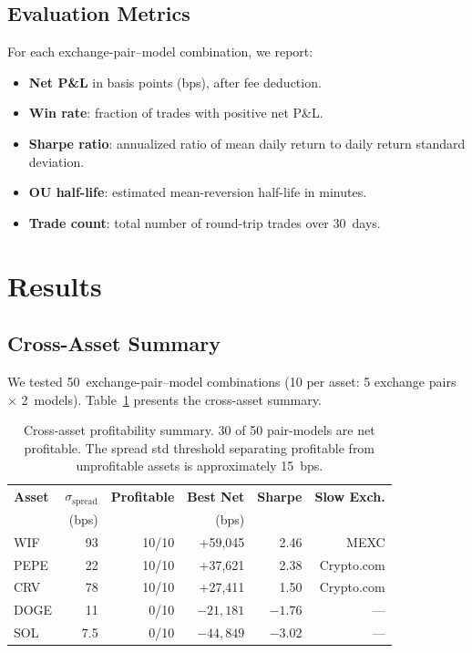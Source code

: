 \documentclass[sigconf,nonacm=false]{acmart}
\begin{document}
\subsection{Evaluation Metrics}

For each exchange-pair--model combination, we report:
\begin{itemize}
    \item \textbf{Net P\&L} in basis points (bps), after fee deduction.
    \item \textbf{Win rate}: fraction of trades with positive net P\&L.
    \item \textbf{Sharpe ratio}: annualized ratio of mean daily return to daily return standard deviation.
    \item \textbf{OU half-life}: estimated mean-reversion half-life in minutes.
    \item \textbf{Trade count}: total number of round-trip trades over 30~days.
\end{itemize}

\section{Results}\label{sec:results}

\subsection{Cross-Asset Summary}

We tested 50~exchange-pair--model combinations (10 per asset: 5 exchange pairs $\times$ 2~models). Table~\ref{tab:summary} presents the cross-asset summary.

\begin{table}[h]
\caption{Cross-asset profitability summary. 30 of 50 pair-models are net profitable. The spread std threshold separating profitable from unprofitable assets is approximately 15~bps.}
\label{tab:summary}
\begin{tabular}{lrrrrr}
\toprule
\textbf{Asset} & $\sigma_{\text{spread}}$ & \textbf{Profitable} & \textbf{Best Net} & \textbf{Sharpe} & \textbf{Slow Exch.} \\
 & (bps) & & (bps) & & \\
\midrule
WIF  & 93   & 10/10 & +59,045 & 2.46 & MEXC \\
PEPE & 22   & 10/10 & +37,621 & 2.38 & Crypto.com \\
CRV  & 78   & 10/10 & +27,411 & 1.50 & Crypto.com \\
DOGE & 11   & 0/10  & $-21{,}181$ & $-1.76$ & --- \\
SOL  & 7.5  & 0/10  & $-44{,}849$ & $-3.02$ & --- \\
\bottomrule
\end{tabular}
\end{table}
\end{document}
